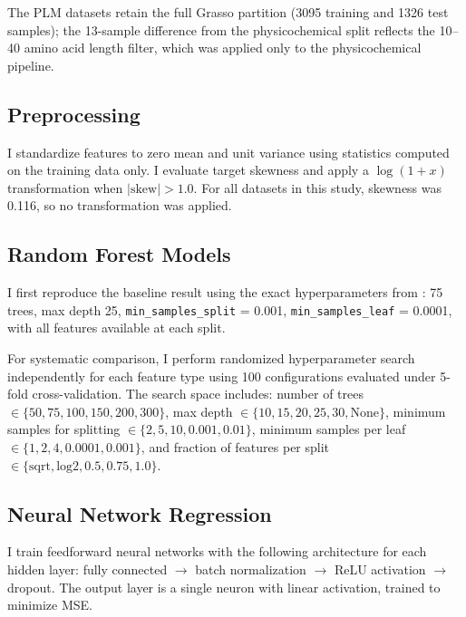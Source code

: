 \documentclass[12pt]{article}
\begin{document}
The PLM datasets retain the full Grasso partition (3095 training and 1326 test samples); the 13-sample difference from the physicochemical split reflects the 10--40 amino acid length filter, which was applied only to the physicochemical pipeline.

\subsection{Preprocessing}
\label{sec:preprocessing}

I standardize features to zero mean and unit variance using statistics computed on the training data only.
I evaluate target skewness and apply a $\log(1+x)$ transformation when $|\text{skew}| > 1.0$.
For all datasets in this study, skewness was 0.116, so no transformation was applied.

\subsection{Random Forest Models}
\label{sec:rf}

I first reproduce the baseline result using the exact hyperparameters from \citet{grasso2023}: 75 trees, max depth 25, \texttt{min\_samples\_split} = 0.001, \texttt{min\_samples\_leaf} = 0.0001, with all features available at each split.

\begin{sloppypar}
For systematic comparison, I perform randomized hyperparameter search independently for each feature type using 100 configurations evaluated under 5-fold cross-validation.
The search space includes: number of trees $\in \{50, 75, 100, 150, 200, 300\}$, max depth $\in \{10, 15, 20, 25, 30, \text{None}\}$, minimum samples for splitting $\in \{2, 5, 10, 0.001, 0.01\}$, minimum samples per leaf $\in \{1, 2, 4, 0.0001, 0.001\}$, and fraction of features per split $\in \{\text{sqrt}, \text{log2}, 0.5, 0.75, 1.0\}$.
\end{sloppypar}

\subsection{Neural Network Regression}
\label{sec:nn}

I train feedforward neural networks with the following architecture for each hidden layer: fully connected $\rightarrow$ batch normalization $\rightarrow$ ReLU activation $\rightarrow$ dropout.
The output layer is a single neuron with linear activation, trained to minimize MSE.
\end{document}
